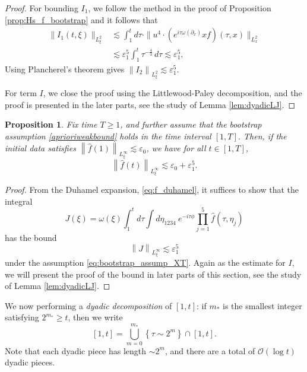 \documentclass[reqno,english,11pt]{amsart}
\newcommand{\eps}{\varepsilon}
\newcommand{\snorm}[1]{\left\|#1\right\|}
\newtheorem{proposition}[theorem]{Proposition}
\theoremstyle{definition}
\numberwithin{equation}{section}
\begin{document}
\begin{proof}
    
    For bounding $I_1$, we follow the method in the proof of Proposition \ref{prop:Hs_f_bootstrap} and it follows that
    \begin{align*}
        \|I_1(t,\xi)\|_{L^2_\xi}&\lesssim \int^t_1 d \tau \cdot \|u^4 \cdot (e^{i\tau \omega(\partial_x)}xf)(\tau,x)\|_{L^2_x}\\
        &\lesssim \eps_1^5 \int^t_1 \tau^{-\frac{4}{3}}\,d \tau \lesssim \eps_1^5,
    \end{align*}
     Using Plancherel's theorem gives $\snorm{I_2}_{L^2_\xi}\lesssim \eps_1^5$.
     
     
     For term $I$, we close the proof  using  the Littlewood-Paley decomposition, and the proof is presented in the later parts, see the study of Lemma \ref{lem:dyadicLJ}.
     \end{proof}
     \begin{proposition}\label{prop:pointwisebound}
     Fix time $T\geq 1$, and further assume that the bootstrap assumption \eqref{aprioriweakbound} holds in the time interval $[1,T]$. Then, if the initial data satisfies 
    $\snorm{\hat{f}(1)}_{L^\infty_\xi}\lesssim \eps_0$, we have for all $t\in [1,T]$,
    \begin{equation}
        \snorm{\hat{f}(t)}_{L^\infty_\xi}\lesssim \eps_0+\eps_1^5.
    \end{equation}
 \end{proposition}
\begin{proof}
     From the Duhamel expansion, \eqref{eq:f_duhamel},  it suffices to show that the integral
\begin{equation}
    \label{eqn:J_defn}
    J(\xi) = \omega(\xi)\int_{1}^{t} d \tau \int d\eta_{1234}\ e^{-i\tau\phi} \prod^5_{j=1}  \widehat{f}\left(\tau, \eta_j\right) 
\end{equation}
has the bound
\begin{equation}
    \label{eqn:Linfty_bnd_wts}   \snorm{J}_{L^{\infty}_{\xi}}\lesssim \eps_1^5
\end{equation}
under the assumption \eqref{eq:bootstrap_assump_XT}.    Again as the estimate for $I$, we will present the proof of the bound in later parts of this section, see the study of Lemma \ref{lem:dyadicLJ}.
\end{proof}


\noindent
We now performing a {\it dyadic decomposition} of $[1,t]$: 
 if $m_{*}$ is the smallest integer satisfying $2^{m_{*}}\geq t$, then we write
$$
[1,t] = \bigcup_{m=0}^{m_{*}} \left\{\tau \sim 2^{m}\right\}\cap [1,t]. 
$$
Note that each dyadic piece has length $\sim 2^{m}$, and there are a total of $\mathcal{O}\left(\operatorname{log} t\right)$ dyadic pieces. 
\end{document}
